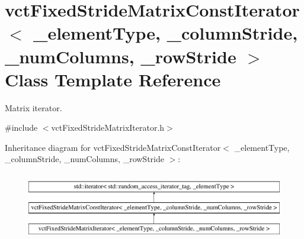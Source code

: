 \hypertarget{classvct_fixed_stride_matrix_const_iterator}{\section{vct\-Fixed\-Stride\-Matrix\-Const\-Iterator$<$ \-\_\-element\-Type, \-\_\-column\-Stride, \-\_\-num\-Columns, \-\_\-row\-Stride $>$ Class Template Reference}
\label{classvct_fixed_stride_matrix_const_iterator}
}


Matrix iterator.  




{\ttfamily \#include $<$vct\-Fixed\-Stride\-Matrix\-Iterator.\-h$>$}

Inheritance diagram for vct\-Fixed\-Stride\-Matrix\-Const\-Iterator$<$ \-\_\-element\-Type, \-\_\-column\-Stride, \-\_\-num\-Columns, \-\_\-row\-Stride $>$\-:\begin{figure}[H]
\begin{center}
\leavevmode
\includegraphics[height=3.000000cm]{db/d74/classvct_fixed_stride_matrix_const_iterator}
\end{center}
\end{figure}

